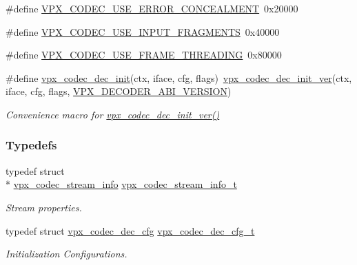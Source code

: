 \begin{DoxyCompactItemize}
\item 
\#define \hyperlink{group__decoder_ga520d7005e360202f5844982fa2392581}{V\+P\+X\+\_\+\+C\+O\+D\+E\+C\+\_\+\+U\+S\+E\+\_\+\+E\+R\+R\+O\+R\+\_\+\+C\+O\+N\+C\+E\+A\+L\+M\+E\+N\+T}~0x20000
\item 
\#define \hyperlink{group__decoder_ga378855a0318396d6e4e585bd3bacbf3f}{V\+P\+X\+\_\+\+C\+O\+D\+E\+C\+\_\+\+U\+S\+E\+\_\+\+I\+N\+P\+U\+T\+\_\+\+F\+R\+A\+G\+M\+E\+N\+T\+S}~0x40000
\item 
\#define \hyperlink{group__decoder_ga203295122fe98b675f94f4409d4684e0}{V\+P\+X\+\_\+\+C\+O\+D\+E\+C\+\_\+\+U\+S\+E\+\_\+\+F\+R\+A\+M\+E\+\_\+\+T\+H\+R\+E\+A\+D\+I\+N\+G}~0x80000
\item 
\#define \hyperlink{group__decoder_ga8c2f0b12f1bd4927eb3c68b01eab19d3}{vpx\+\_\+codec\+\_\+dec\+\_\+init}(ctx, iface, cfg, flags)~\hyperlink{group__decoder_ga26fe82cf8fd697f885935cea53be964f}{vpx\+\_\+codec\+\_\+dec\+\_\+init\+\_\+ver}(ctx, iface, cfg, flags, \hyperlink{group__decoder_ga462b459e7ae13937e1eae1776245db12}{V\+P\+X\+\_\+\+D\+E\+C\+O\+D\+E\+R\+\_\+\+A\+B\+I\+\_\+\+V\+E\+R\+S\+I\+O\+N})
\begin{DoxyCompactList}\small\item\em Convenience macro for \hyperlink{group__decoder_ga26fe82cf8fd697f885935cea53be964f}{vpx\+\_\+codec\+\_\+dec\+\_\+init\+\_\+ver()} \end{DoxyCompactList}\end{DoxyCompactItemize}
\subsubsection*{Typedefs}
\begin{DoxyCompactItemize}
\item 
typedef struct \\*
\hyperlink{structvpx__codec__stream__info}{vpx\+\_\+codec\+\_\+stream\+\_\+info} \hyperlink{group__decoder_ga900420e8f7cb9c1b3070b2ba7d636974}{vpx\+\_\+codec\+\_\+stream\+\_\+info\+\_\+t}
\begin{DoxyCompactList}\small\item\em Stream properties. \end{DoxyCompactList}\item 
typedef struct \hyperlink{structvpx__codec__dec__cfg}{vpx\+\_\+codec\+\_\+dec\+\_\+cfg} \hyperlink{group__decoder_ga4a2e808eb43f1e798024b5a409c484f9}{vpx\+\_\+codec\+\_\+dec\+\_\+cfg\+\_\+t}
\begin{DoxyCompactList}\small\item\em Initialization Configurations. \end{DoxyCompactList}\end{DoxyCompactItemize}
